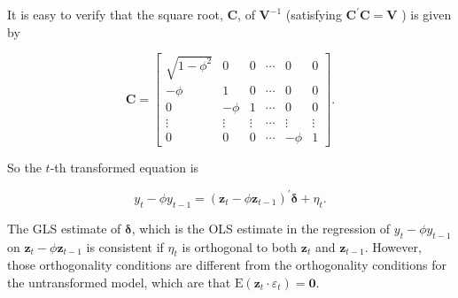 \documentclass[10pt]{article}
\begin{document}
It is easy to verify that the square root, $\mathbf{C}$, of $\mathbf{V}^{-1}$ (satisfying $\mathbf{C}^{\prime} \mathbf{C}=\mathbf{V}$ ) is given by

\[
\mathbf{C}=\left[\begin{array}{cccccc}
\sqrt{1-\phi^{2}} & 0 & 0 & \cdots & 0 & 0  \tag{6.7.13}\\
-\phi & 1 & 0 & \cdots & 0 & 0 \\
0 & -\phi & 1 & \cdots & 0 & 0 \\
\vdots & \vdots & \vdots & \cdots & \vdots & \vdots \\
0 & 0 & 0 & \cdots & -\phi & 1
\end{array}\right] .
\]

So the $t$-th transformed equation is


\begin{equation*}
y_{t}-\phi y_{t-1}=\left(\mathbf{z}_{t}-\phi \mathbf{z}_{t-1}\right)^{\prime} \boldsymbol{\delta}+\eta_{t} . \tag{6.7.14}
\end{equation*}


The GLS estimate of $\boldsymbol{\delta}$, which is the OLS estimate in the regression of $y_{t}-\phi y_{t-1}$ on $\mathbf{z}_{t}-\phi \mathbf{z}_{t-1}$ is consistent if $\eta_{t}$ is orthogonal to both $\mathbf{z}_{t}$ and $\mathbf{z}_{t-1}$. However, those orthogonality conditions are different from the orthogonality conditions for the untransformed model, which are that $\mathrm{E}\left(\mathbf{z}_{t} \cdot \varepsilon_{t}\right)=\mathbf{0}$.
\end{document}
